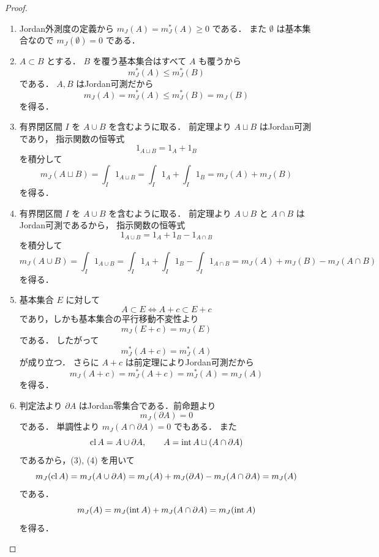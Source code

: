 \begin{proof}
\begin{enumerate}
    \item Jordan外測度の定義から $m_J(A)=m_J^*(A)\ge 0$ である．
    また $\emptyset$ は基本集合なので $m_J(\emptyset)=0$ である．

    \item $A \subset B$ とする．
    $B$ を覆う基本集合はすべて $A$ も覆うから
    \[
    m_J^*(A)\le m_J^*(B)
    \]
    である．
    $A,B$ はJordan可測だから
    \[
    m_J(A)=m_J^*(A)\le m_J^*(B)=m_J(B)
    \]
    を得る．

    \item 有界閉区間 $I$ を $A\cup B$ を含むように取る．
    前定理より $A\sqcup B$ はJordan可測であり，
    指示関数の恒等式
    \[
    1_{A\sqcup B}=1_A+1_B
    \]
    を積分して
    \[
    m_J(A\sqcup B)
    =\int_I 1_{A\sqcup B}
    =\int_I 1_A+\int_I 1_B
    =m_J(A)+m_J(B)
    \]
    を得る．

    \item 有界閉区間 $I$ を $A\cup B$ を含むように取る．
    前定理より $A\cup B$ と $A\cap B$ はJordan可測であるから，
    指示関数の恒等式
    \[
    1_{A\cup B}=1_A+1_B-1_{A\cap B}
    \]
    を積分して
    \[
    m_J(A\cup B)
    =\int_I 1_{A\cup B}
    =\int_I 1_A+\int_I 1_B-\int_I 1_{A\cap B}
    =m_J(A)+m_J(B)-m_J(A\cap B)
    \]
    を得る．

    \item 基本集合 $E$ に対して
    \[
    A \subset E \iff A+c \subset E+c
    \]
    であり，しかも基本集合の平行移動不変性より
    \[
    m_J(E+c)=m_J(E)
    \]
    である．
    したがって
    \[
    m_J^*(A+c)=m_J^*(A)
    \]
    が成り立つ．
    さらに $A+c$ は前定理によりJordan可測だから
    \[
    m_J(A+c)=m_J^*(A+c)=m_J^*(A)=m_J(A)
    \]
    を得る．

    \item 判定法より $\partial A$ はJordan零集合である．前命題より
    \[
    m_J(\partial A)=0
    \]
    である．
    単調性より $m_J(A\cap \partial A)=0$ でもある．
    また
    \[
    \operatorname{cl} A = A\cup \partial A,
    \qquad
    A=\operatorname{int} A \sqcup (A\cap \partial A)
    \]
    であるから，(3), (4) を用いて
    \[
    m_J(\operatorname{cl} A)
    =m_J(A\cup \partial A)
    =m_J(A)+m_J(\partial A)-m_J(A\cap \partial A)
    =m_J(A)
    \]
    である．
    \[
    m_J(A)=m_J(\operatorname{int} A)+m_J(A\cap \partial A)=m_J(\operatorname{int} A)
    \]
    を得る．
\end{enumerate}
\end{proof}
